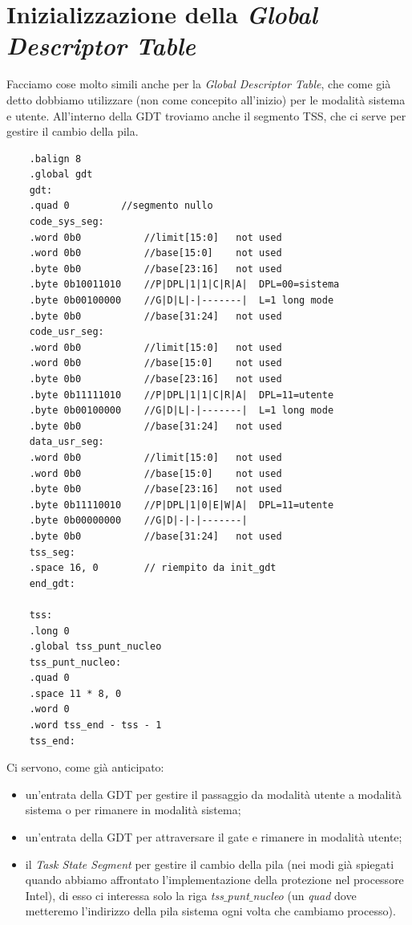 \section{Inizializzazione della \emph{Global Descriptor Table}}
Facciamo cose molto simili anche per la \emph{Global Descriptor Table}, che come già detto dobbiamo utilizzare (non come concepito all'inizio) per le modalità sistema e utente. All'interno della GDT troviamo anche il segmento TSS, che ci serve per gestire il cambio della pila.
\small 
\begin{verbatim}
	.balign 8
	.global gdt
	gdt:
	.quad 0		    //segmento nullo
	code_sys_seg:
	.word 0b0           //limit[15:0]   not used
	.word 0b0           //base[15:0]    not used
	.byte 0b0           //base[23:16]   not used
	.byte 0b10011010    //P|DPL|1|1|C|R|A|  DPL=00=sistema
	.byte 0b00100000    //G|D|L|-|-------|  L=1 long mode
	.byte 0b0           //base[31:24]   not used
	code_usr_seg:
	.word 0b0           //limit[15:0]   not used
	.word 0b0           //base[15:0]    not used
	.byte 0b0           //base[23:16]   not used
	.byte 0b11111010    //P|DPL|1|1|C|R|A|  DPL=11=utente
	.byte 0b00100000    //G|D|L|-|-------|  L=1 long mode
	.byte 0b0           //base[31:24]   not used
	data_usr_seg:
	.word 0b0           //limit[15:0]   not used
	.word 0b0           //base[15:0]    not used
	.byte 0b0           //base[23:16]   not used
	.byte 0b11110010    //P|DPL|1|0|E|W|A|  DPL=11=utente
	.byte 0b00000000    //G|D|-|-|-------|
	.byte 0b0           //base[31:24]   not used
	tss_seg:
	.space 16, 0	    // riempito da init_gdt
	end_gdt:
	
	tss:
	.long 0
	.global tss_punt_nucleo
	tss_punt_nucleo:
	.quad 0
	.space 11 * 8, 0
	.word 0
	.word tss_end - tss - 1
	tss_end:
\end{verbatim}
\normalsize 
Ci servono, come già anticipato:
\begin{itemize}
	\item un'entrata della GDT per gestire il passaggio da modalità utente a modalità sistema o per rimanere in modalità sistema;
	\item un'entrata della GDT per attraversare il gate e rimanere in modalità utente;
	\item il \emph{Task State Segment} per gestire il cambio della pila (nei modi già spiegati quando abbiamo affrontato l'implementazione della protezione nel processore Intel), di esso ci interessa solo la riga \emph{tss$\_$punt$\_$nucleo} (un \emph{quad} dove metteremo l'indirizzo della pila sistema ogni volta che cambiamo processo).
\end{itemize}

